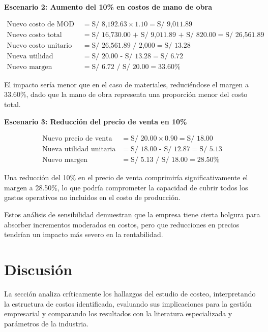 \documentclass[
  stu,
  floatsintext,
  longtable,
  a4paper,
  nolmodern,
  notxfonts,
  notimes,
  12pt,
  colorlinks=true,linkcolor=blue,citecolor=blue,urlcolor=blue]{apa7}
\begin{document}
\textbf{Escenario 2: Aumento del 10\% en costos de mano de obra}

\[
\begin{aligned}
\text{Nuevo costo de MOD} &= \text{S/ 8,192.63} \times 1.10 = \text{S/ 9,011.89} \\
\text{Nuevo costo total} &= \text{S/ 16,730.00 + S/ 9,011.89 + S/ 820.00} = \text{S/ 26,561.89} \\
\text{Nuevo costo unitario} &= \text{S/ 26,561.89 / 2,000} = \text{S/ 13.28} \\
\text{Nueva utilidad unitaria} &= \text{S/ 20.00 - S/ 13.28} = \text{S/ 6.72} \\
\text{Nuevo margen} &= \text{S/ 6.72 / S/ 20.00} = 33.60\%
\end{aligned}
\]

El impacto sería menor que en el caso de materiales, reduciéndose el
margen a 33.60\%, dado que la mano de obra representa una proporción
menor del costo total.

\textbf{Escenario 3: Reducción del precio de venta en 10\%}

\[
\begin{aligned}
\text{Nuevo precio de venta} &= \text{S/ 20.00} \times 0.90 = \text{S/ 18.00} \\
\text{Nueva utilidad unitaria} &= \text{S/ 18.00 - S/ 12.87} = \text{S/ 5.13} \\
\text{Nuevo margen} &= \text{S/ 5.13 / S/ 18.00} = 28.50\%
\end{aligned}
\]

Una reducción del 10\% en el precio de venta comprimiría
significativamente el margen a 28.50\%, lo que podría comprometer la
capacidad de cubrir todos los gastos operativos no incluidos en el costo
de producción.

Estos análisis de sensibilidad demuestran que la empresa tiene cierta
holgura para absorber incrementos moderados en costos, pero que
reducciones en precios tendrían un impacto más severo en la
rentabilidad.

\section{Discusión}\label{discusiuxf3n}

La sección analiza críticamente los hallazgos del estudio de costeo,
interpretando la estructura de costos identificada, evaluando sus
implicaciones para la gestión empresarial y comparando los resultados
con la literatura especializada y parámetros de la industria.
\end{document}
